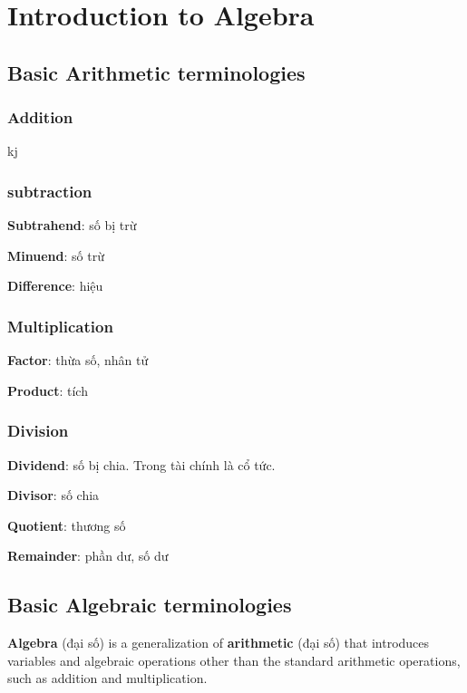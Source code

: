 \chapter{Introduction to Algebra}

\section{Basic Arithmetic terminologies}

\subsection{Addition}

kj

\subsection{subtraction}

\textbf{Subtrahend}: số bị trừ

\textbf{Minuend}: số trừ

\textbf{Difference}: hiệu

\subsection{Multiplication}

\textbf{Factor}: thừa số, nhân tử

\textbf{Product}: tích

\subsection{Division}

\textbf{Dividend}: số bị chia. Trong tài chính là cổ tức.

\textbf{Divisor}: số chia

\textbf{Quotient}: thương số

\textbf{Remainder}: phần dư, số dư

\section{Basic Algebraic terminologies}

\textbf{Algebra} (đại số) is a generalization of \textbf{arithmetic} (đại số) that introduces variables and algebraic operations other than the standard arithmetic operations, such as addition and multiplication.

\vspace{5mm}

